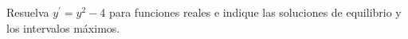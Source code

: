 Resuelva $y^{\prime}=y^2-4$ para funciones reales e indique las soluciones de equilibrio y los intervalos máximos.
